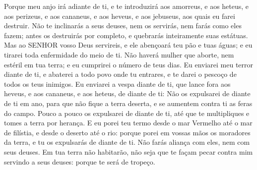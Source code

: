 {Porque meu anjo irá adiante de ti, e te introduzirá aos amorreus, e aos heteus, e aos perizeus, e aos cananeus, e aos heveus, e aos jebuseus, aos quais eu farei destruir.
Não te inclinarás a seus deuses, nem os servirás, nem farás como eles fazem; antes os destruirás por completo, e quebrarás inteiramente suas estátuas.
Mas ao SENHOR vosso Deus servireis, e ele abençoará teu pão e tuas águas; e eu tirarei toda enfermidade do meio de ti.
Não haverá mulher que aborte, nem estéril em tua terra; e eu cumprirei o número de teus dias.
Eu enviarei meu terror diante de ti, e abaterei a todo povo onde tu entrares, e te darei o pescoço de todos os teus inimigos.
Eu enviarei a vespa diante de ti, que lance fora aos heveus, e aos cananeus, e aos heteus, de diante de ti:
Não os expulsarei de diante de ti em ano, para que não fique a terra deserta, e se aumentem contra ti as feras do campo.
Pouco a pouco os expulsarei de diante de ti, até que te multipliques e tomes a terra por herança.
E eu porei teu termo desde o mar Vermelho até o mar de filístia, e desde o deserto até o rio: porque porei em vossas mãos os moradores da terra, e tu os expulsarás de diante de ti.
Não farás aliança com eles, nem com seus deuses.
Em tua terra não habitarão, não seja que te façam pecar contra mim servindo a seus deuses: porque te será de tropeço.

}
